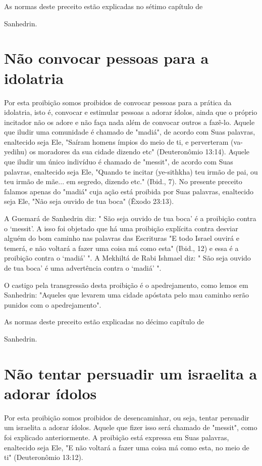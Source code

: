 \begin{itemize}
\begin{enumrate}
\begin{itemize}
\begin{itemize}
\begin{itemize}
As normas deste preceito estão explicadas no sétimo capítulo de


Sanhedrin.

\section{Não convocar pessoas para a idolatria}

Por esta proibição somos proibidos de convocar pessoas para a práti­ca
da idolatria, isto é, convocar e estimular pessoas a adorar ídolos,
ainda que o próprio incitador não os adore e não faça nada além de
convocar outros a fazê-lo. Aquele que iludir uma comunidade é chamado de
"madiá", de acordo com Suas palavras, enaltecido seja Ele, "Saíram
homens ímpios do meio de ti, e per­verteram (va-yedihu) os moradores da
sua cidade dizendo etc" (Deuteronômio 13:14). Aquele que iludir um único
indivíduo é chamado de "messit", de acordo com Suas palavras, enaltecido
seja Ele, "Quando te incitar (ye-sithkha) teu irmão de pai, ou teu irmão
de mãe... em segredo, dizendo etc." (Ibid., 7). No presente preceito
falamos apenas do "madiá" cuja ação está proibida por Suas palavras,
enaltecido seja Ele, "Não seja ouvido de tua boca" (Êxodo 23:13).

A Guemará de Sanhedrin diz: " São seja ouvido de tua boca' é a proibição
contra o `messit'. A isso foi objetado que há uma proibição explícita
contra desviar alguém do bom caminho nas palavras das Escrituras "E todo
Is­rael ouvirá e temerá, e não voltará a fazer uma coisa má como esta"
(Ibid., 12) e essa é a proibição contra o `madiá' ". A Mekhiltá de Rabi
Ishmael diz: " São seja ouvido de tua boca' é uma advertência contra o
`madiá' ".

O castigo pela transgressão desta proibição é o apedrejamento, co­mo
lemos em Sanhedrin: "Aqueles que levarem uma cidade apóstata pelo mau
caminho serão punidos com o apedrejamento".


As normas deste preceito estão explicadas no décimo capítulo de


Sanhedrin.

\section{Não tentar persuadir um israelita a adorar ídolos}

Por esta proibição somos proibidos de desencaminhar, ou seja, ten­tar
persuadir um israelita a adorar ídolos. Aquele que fizer isso será
chamado de "messit", como foi explicado anteriormente. A proibição está
expressa em Suas palavras, enaltecido seja Ele, "E não voltará a fazer
uma coisa má como esta, no meio de ti" (Deuteronômio 13:12).


\end{itemize}
\end{itemize}
\end{itemize}
\end{enumrate}
\end{itemize}
